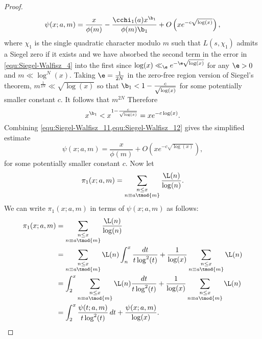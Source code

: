 \begin{proof}
        \begin{equation}\label{equ:Siegel-Walfisz_11}
          \psi(x;a,m) = \frac{x}{\phi(m)}-\frac{\cchi_{1}(a)x^{\b_{1}}}{\phi(m)\b_{1}}+O\left(xe^{-c\sqrt{\log(x)}}\right),
        \end{equation}
        where $\chi_{1}$ is the single quadratic character modulo $m$ such that $L(s,\chi_{1})$ admits a Siegel zero if it exists and we have absorbed the second term in the error in \cref{equ:Siegel-Walfisz_4} into the first since $\log(x) \ll_{\e} e^{-\e\sqrt{\log(x)}}$ for any $\e > 0$ and $m \ll \log^{N}(x)$. Taking $\e = \frac{1}{2N}$ in the zero-free region version of Siegel's theorem, $m^\frac{1}{2N} \ll \sqrt{\log(x)}$ so that $\b_{1} < 1-\frac{c}{\sqrt{\log(x)}}$ for some potentially smaller constant $c$. It follows that $m^{2N}$ Therefore
        \begin{equation}\label{equ:Siegel-Walfisz_12}
          x^{\b_{1}} < x^{1-\frac{c}{\sqrt{\log(x)}}} = xe^{-c\log(x)}.
        \end{equation}
        Combining \cref{equ:Siegel-Walfisz_11,equ:Siegel-Walfisz_12} gives the simplified estimate
        \begin{equation}\label{equ:Siegel-Walfisz_13}
          \psi(x;a,m) = \frac{x}{\phi(m)}+O\left(xe^{-c\sqrt{\log(x)}}\right),
        \end{equation}
        for some potentially smaller constant $c$. Now let
        \[
          \pi_{1}(x;a,m) = \sum_{\substack{n \le x \\ n \equiv a \tmod{m}}}\frac{\L(n)}{\log(n)}.
        \]
        We can write $\pi_{1}(x;a,m)$ in terms of $\psi(x;a,m)$ as follows:
        \begin{align*}
          \pi_{1}(x;a,m) &= \sum_{\substack{n \le x \\ n \equiv a \tmod{m}}}\frac{\L(n)}{\log(n)} \\
          &= \sum_{\substack{n \le x \\ n \equiv a \tmod{m}}}\L(n)\int_{n}^{x}\frac{dt}{t\log^{2}(t)}+\frac{1}{\log(x)}\sum_{\substack{n \le x \\ n \equiv a \tmod{m}}}\L(n) \\
          &= \int_{2}^{x}\sum_{\substack{n \le x \\ n \equiv a \tmod{m}}}\L(n)\frac{dt}{t\log^{2}(t)}+\frac{1}{\log(x)}\sum_{\substack{n \le x \\ n \equiv a \tmod{m}}}\L(n) \\
          &= \int_{2}^{x}\frac{\psi(t;a,m)}{t\log^{2}(t)}\,dt+\frac{\psi(x;a,m)}{\log(x)}.

\end{align*}
\end{proof}

